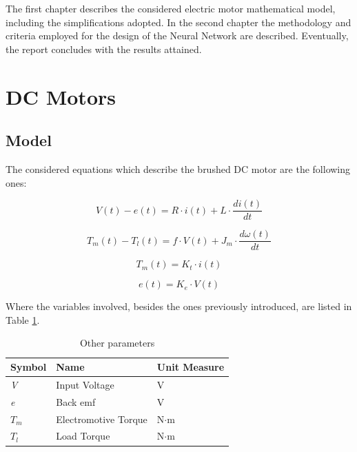 The first chapter describes the considered electric motor mathematical model, including the simplifications adopted. In the second chapter the methodology and criteria employed for the design of the Neural Network are described. Eventually, the report concludes with the results attained.


\section{\textbf{DC Motors}}


\subsection{Model}

The considered equations which describe the brushed DC motor are the following ones:

\begin{equation}
 	V(t)-e(t) = R \cdot i(t)+L \cdot \dfrac{di(t)}{dt}
\end{equation}

\begin{equation}
	T_m(t)-T_l(t) = f \cdot V(t)+J_m \cdot \dfrac{d \omega (t)}{dt}
\end{equation}

\begin{equation}
	T_m(t) = K_t \cdot i(t)
\end{equation}

\begin{equation}
	e(t)= K_e \cdot V(t)
\end{equation}

Where the variables involved, besides the ones previously introduced, are listed in Table \ref{table:otherprm}.

\break

\begin{table}[h!] %
\centering	 
\renewcommand{\arraystretch}{1.5} 
\begin{tabular}{| l l l |} 
 \hline
 Symbol & Name & Unit Measure \\ [0.5ex]  
 \hline\hline
	\textit{V} & Input Voltage & V\\ 
	\textit{e} & Back emf & V\\
	\textit{$T_m$} & Electromotive Torque & N$\cdot$m\\
	\textit{$T_l$} & Load Torque & N$\cdot$m  \\ 
 \hline
\end{tabular}
\caption{Other parameters}
\label{table:otherprm}
\end{table}
	
